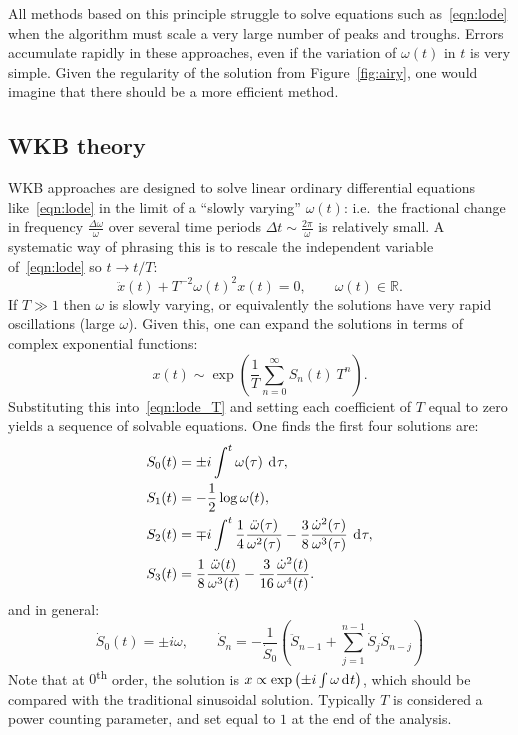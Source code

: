 All methods based on this principle struggle to solve equations such as~\eqref{eqn:lode} when the algorithm must scale a very large number of peaks and troughs. Errors accumulate rapidly in these approaches, even if the variation of \(\omega(t)\) in \(t\) is very simple. Given the regularity of the solution from Figure~\ref{fig:airy}, one would imagine that there should be a more efficient method.


\subsection{WKB theory}
\label{sec:wkb}
WKB approaches are designed to solve linear ordinary differential equations like~\eqref{eqn:lode} in the limit of a ``slowly varying'' \(\omega(t)\): i.e.\ the fractional change in frequency \(\frac{\Delta\omega}{\omega}\) over several time periods \(\Delta t \sim \frac{2\pi}{\omega}\) is relatively small.
A systematic way of phrasing this is to rescale the independent variable of~\eqref{eqn:lode} so \(t\rightarrow t/T\):
\begin{equation}
  \ddot{x}(t) + T^{-2}{\omega(t)}^2x(t) = 0,\qquad \omega(t)\in\mathbb{R}.
  \label{eqn:lode_T}
\end{equation}
If \(T\gg1\) then \(\omega\) is slowly varying, or equivalently the solutions have very rapid oscillations (large \(\omega\)). Given this, one can expand the solutions in terms of complex exponential functions:
\begin{equation}
  x(t)\sim \exp\left( \frac{1}{T}\sum\limits_{n=0}^{\infty} S_n(t)\: T^n \right).
  \label{eqn:asymp}
\end{equation}
Substituting this into~\eqref{eqn:lode_T} and setting each coefficient of \(T\) equal to zero yields a sequence of solvable equations. One finds the first four solutions are:
\begin{align}
  S_0(t) &= \pm i \int^t \omega(\tau)\: \operatorname{d}^{}\!{\tau},
  \label{eqn:S0}\\
  S_1(t) &= -\frac{1}{2}\log \omega(t),\\
  S_2(t) &=  \mp i \int^t \frac{1}{4}\frac{\ddot{\omega}(\tau)}{\omega^{2}(\tau)} - \frac{3}{8}\frac{\dot{\omega}^2(\tau)}{\omega^{3}(\tau)}\: \operatorname{d}^{}\!{\tau}, \\
  S_3(t) &=  \frac{1}{8}\frac{\ddot{\omega}(t)}{\omega^{3}(t)} - \frac{3}{16} \frac{\dot{\omega}^{2}(t)}{\omega^{4}(t)}.
\end{align}
and in general:
\begin{equation}
    \dot{S}_0(t) = \pm i \omega, \qquad \dot{S}_n = -\frac{1}{\dot{S}_0} \left( \ddot{S}_{n-1}+ \sum_{j=1}^{n-1}\dot{S}_j\dot{S}_{n-j}  \right)
\end{equation}
Note that at \(0\)\textsuperscript{th} order, the solution is \(x\propto\exp\left(\pm i \int \omega \operatorname{d}^{}\!{t} \right)\), which should be compared with the traditional sinusoidal solution.
Typically \(T\) is considered a power counting parameter, and set equal to \(1\) at the end of the analysis.

